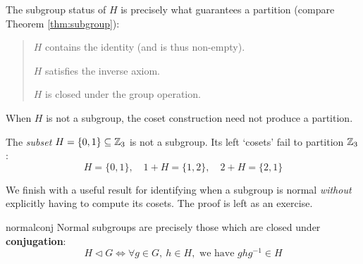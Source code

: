 The subgroup status of $H$ is precisely what guarantees a partition (compare Theorem \ref{thm:subgroup}):
\begin{quote}
	\begin{description}\itemsep2pt
		\item[\normalfont\emph{Reflexivity}:]  $H$ contains the identity (and is thus non-empty).
		\item[\normalfont\emph{Symmetry}:] $H$ satisfies the inverse axiom.
		\item[\normalfont\emph{Transitivity}:] $H$ is closed under the group operation.
	\end{description}
\end{quote}

When $H$ is not a subgroup, the coset construction need not produce a partition.

\begin{example}{}{}
	The \emph{subset} $H=\{0,1\}\subseteq\mathbb{Z}_3$ is not a subgroup. Its left `cosets' fail to partition $\mathbb{Z}_3$:
	\[
		H=\{0,1\},\quad 1+H=\{1,2\},\quad 2+H=\{2,1\}
	\]
\end{example}

\goodbreak

We finish with a useful result for identifying when a subgroup is normal \emph{without} explicitly having to compute its cosets. The proof is left as an exercise.

\begin{cor}{}{normalconj}
	Normal subgroups are precisely those which are closed under \textbf{conjugation}:
  \[
  	H\triangleleft G\iff \forall g\in G,\ h\in H,\text{ we have }gh g^{-1}\in H
  \]
\end{cor}




